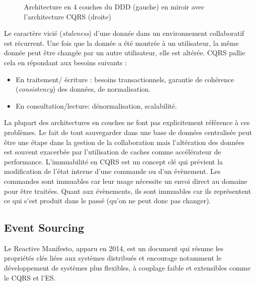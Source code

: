 \begin{figure}[ht]
	\noindent
	\centering
	\caption{Architecture en 4 couches du DDD (gauche) en miroir avec 
		l'architecture CQRS 
		(droite)}
	\label{fig:dddcqrs}
\end{figure}



Le caractère vicié (\textit{staleness}) d'une donnée dans un environnement 
collaboratif est récurrent. Une fois que la donnée a été montrée à un utilisateur, la 
même donnée peut être changée par un autre utilisateur, elle est altérée. 
\gls{CQRS} pallie cela en répondant aux besoins suivants :
\begin{itemize}
	\item En traitement/ écriture : besoins transactionnels, garantie de cohérence 
	(\textit{consistency}) des données, de normalisation.
	\item En consultation/lecture: dénormalisation, scalabilité. 
\end{itemize}

La plupart des architectures en couches ne font pas explicitement référence à ces 
problèmes. Le fait de tout sauvegarder dans une base de données centralisée peut 
être une étape dans la gestion de la collaboration mais l'altération des données est 
souvent exacerbée par l'utilisation de caches comme accélérateur de performance.
L'immuabilité en \gls{CQRS} est un concept clé qui prévient la  
modification de l'état interne d'une commande ou d'un évènement. Les 
commandes sont immuables car leur usage nécessite un envoi direct au domaine 
pour être traitées. Quant aux évènements, ils sont immuables car ils représentent 
ce qui s'est produit dans le passé (qu'on ne peut donc pas changer). 

\subsection{Event Sourcing}
\label{sec:es}

Le Reactive Manifesto, apparu en 2014, est un document qui résume les 
propriétés clés liées aux systèmes distribués et encourage notamment le 
développement de systèmes \og plus flexibles, à couplage faible et 
extensibles\fg{}\cite{Boner2014TheManifesto} comme le \gls{CQRS} et l'\gls{ES}.

